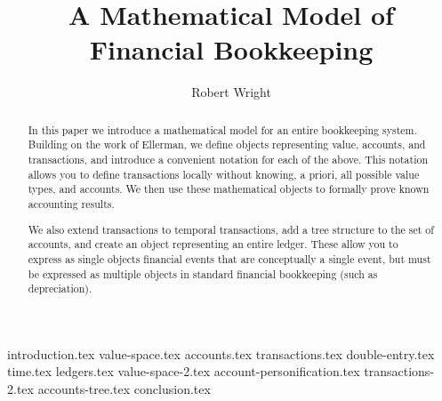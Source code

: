 \documentclass[11pt]{article}
\title{A Mathematical Model of Financial Bookkeeping}
\author{Robert Wright}
\begin{document}
    \abovedisplayskip=12pt
    \belowdisplayskip=12pt
    \abovedisplayshortskip=0pt
    \belowdisplayshortskip=7pt

    \begin{titlepage}
        \maketitle

        \begin{abstract}
            In this paper we introduce a mathematical model for an entire bookkeeping system.
            Building on the work of Ellerman, we define objects representing value, accounts, and transactions,
            and introduce a convenient notation for each of the above.
            This notation allows you to define transactions locally \textendash{} without knowing, a priori,
            all possible value types, and accounts.
            We then use these mathematical objects to formally prove known accounting results.

            We also extend transactions to temporal transactions, add a tree structure to the set of accounts,
            and create an object representing an entire ledger.
            These allow you to express as single objects financial events that are conceptually a single event,
            but must be expressed as multiple objects in standard financial bookkeeping
            (such as depreciation).
        \end{abstract}
    \end{titlepage}

    {introduction.tex}
    {value-space.tex}
    {accounts.tex}
    {transactions.tex}
    {double-entry.tex}
    {time.tex}
    {ledgers.tex}
    {value-space-2.tex}
    {account-personification.tex}
    {transactions-2.tex}
    {accounts-tree.tex}
    {conclusion.tex}

    
    
\end{document}
